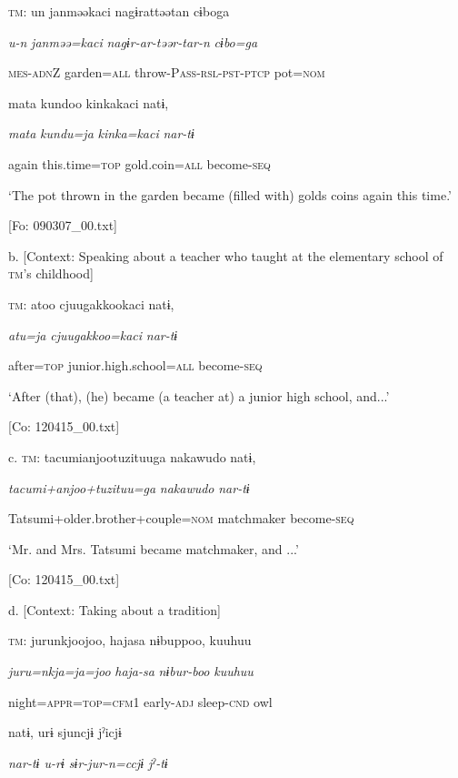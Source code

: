     \textsc{tm}:  un  janməəkaci  nagɨrattəətan  cɨboga

      \textit{u-n}  \textit{janməə=kaci}  \textit{nagɨr-ar-təər-tar-n}  \textit{cɨbo=ga}

      \textsc{mes}-\textsc{adn}Z  garden=\textsc{all}  throw-P\textsc{ass}-\textsc{rsl}-\textsc{pst}-\textsc{ptcp}  pot=\textsc{nom}

      mata  kundoo  kinkakaci  natɨ,

      \textit{mata}  \textit{kundu=ja}  \textit{kinka=kaci}  \textit{nar{}-tɨ}

      again  this.time=\textsc{top}  gold.coin=\textsc{all}  become-\textsc{seq}

      ‘The pot thrown in the garden became (filled with) golds coins again this time.’

      [Fo: 090307\_00.txt]

  b.  [Context: Speaking about a teacher who taught at the elementary school of \textsc{tm}’s childhood]

    \textsc{tm}:  atoo  cjuugakkookaci  natɨ,

      \textit{atu=ja}  \textit{cjuugakkoo=kaci}  \textit{nar{}-tɨ}

      after=\textsc{top}  junior.high.school=\textsc{all}  become-\textsc{seq}

      ‘After (that), (he) became (a teacher at) a junior high school, and...’

      [Co: 120415\_00.txt]

  c.  \textsc{tm}:  tacumianjootuzituuga  nakawudo  natɨ,

      \textit{tacumi+anjoo+tuzituu=ga}  \textit{nakawudo}  \textit{nar{}-tɨ}

      Tatsumi+older.brother+couple=\textsc{nom}  matchmaker  become-\textsc{seq}

      ‘Mr. and Mrs. Tatsumi became matchmaker, and ...’

      [Co: 120415\_00.txt]

  d.  [Context: Taking about a tradition]

    \textsc{tm}:  jurunkjoojoo,  hajasa  nɨbuppoo,  kuuhuu

      \textit{juru=nkja=ja=joo}  \textit{haja-sa}  \textit{nɨbur-boo}  \textit{kuuhuu}

      night=\textsc{appr}=\textsc{top}=\textsc{cfm}1  early-\textsc{adj}  sleep-\textsc{cnd}  owl

      natɨ,  urɨ  sjuncjɨ  jˀicjɨ

      \textit{nar{}-tɨ  u-rɨ  sɨr-jur-n=ccjɨ  jˀ-tɨ}

